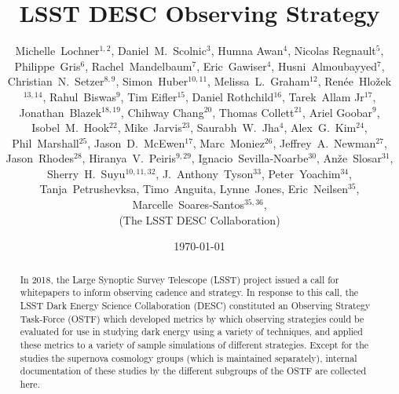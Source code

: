 \documentclass[modern,skiphelvet]{lsstdescnote}
\begin{document}
\title{LSST DESC Observing Strategy}
\author{
\parbox{0.9\textwidth}{
\normalsize
Michelle~Lochner$^{1,2}$,
Daniel~M.~Scolnic$^{3}$,
Humna Awan$^{4}$,
Nicolas Regnault$^{5}$,
Philippe~Gris$^{6}$,
Rachel~Mandelbaum$^{7}$,
Eric~Gawiser$^{4}$,
Husni~Almoubayyed$^{7}$,
Christian~N.~Setzer$^{8,9}$,
Simon~Huber$^{10,11}$,
Melissa~L.~Graham$^{12}$,
Ren\'ee~Hlo\v{z}ek$^{13,14}$,
Rahul~Biswas$^{9}$,
Tim Eifler$^{15}$,
Daniel Rothchild$^{16}$,
Tarek~Allam Jr$^{17}$,
Jonathan~Blazek$^{18,19}$,
Chihway Chang$^{20}$,
Thomas Collett$^{21}$,
Ariel Goobar$^{9}$,
Isobel~M.~Hook$^{22}$,
Mike~Jarvis$^{23}$,
Saurabh~W.~Jha$^{4}$,
Alex~G.~Kim$^{24}$,
Phil~Marshall$^{25}$,
Jason~D.~McEwen$^{17}$,
Marc~Moniez$^{26}$,
Jeffrey~A.~Newman$^{27}$,
Jason~Rhodes$^{28}$,
Hiranya~V.~Peiris$^{9,29}$,
Ignacio~Sevilla-Noarbe$^{30}$,
An\v{z}e~Slosar$^{31}$,
Sherry~H.~Suyu$^{10,11,32}$,
J.~Anthony~Tyson$^{33}$,
Peter~Yoachim$^{34}$,
Tanja~Petrushevksa,
Timo~Anguita,
Lynne~Jones,
Eric~Neilsen$^{35}$,
Marcelle~Soares-Santos$^{35,36}$,
\begin{center}(The LSST DESC Collaboration)\end{center}
}}
\date{\today}

\maketitle

\begin{abstract}
In 2018, the Large Synoptic Survey Telescope (LSST) project issued a
call for whitepapers to inform observing cadence and strategy. In
response to this call, the LSST Dark Energy Science Collaboration
(DESC) constituted an Observing Strategy Task-Force (OSTF) which
developed metrics by which observing strategies could be evaluated for
use in studying dark energy using a variety of techniques, and applied
these metrics to a variety of sample simulations of different
strategies. Except for the studies the supernova cosmology groups
(which is maintained separately), internal documentation of these
studies by the different subgroups of the OSTF are collected here.
\end{abstract}

\pagebreak
\tableofcontents

\pagebreak


\pagebreak


\pagebreak

\pagebreak

\pagebreak

\pagebreak

\pagebreak


% 

\pagebreak

\pagebreak

\pagebreak

% 





\end{document}
